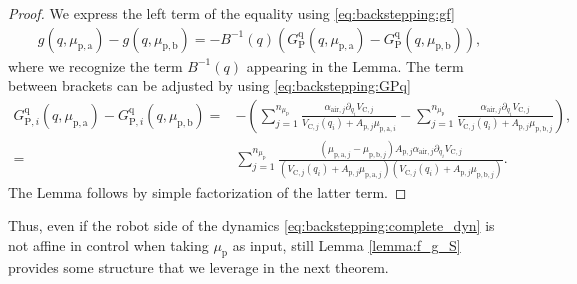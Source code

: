 \begin{proof}
	We express the left term of the equality using \eqref{eq:backstepping:gf}
	\begin{equation*}%
	\begin{split}
	g(q,\mu_{\mathrm{p},\mathrm{a}}) - g(q,\mu_{\mathrm{p},\mathrm{b}}) 
	=-B^{-1}(q) (G_{\mathrm{P}}^{\mathrm{q}}(q,\mu_{\mathrm{p},\mathrm{a}}) - G_{\mathrm{P}}^{\mathrm{q}}(q,\mu_{\mathrm{p},\mathrm{b}})),
	\end{split}
	\end{equation*}
	where we recognize the term $B^{-1}(q)$ appearing in the Lemma. The term between brackets can be adjusted by using \eqref{eq:backstepping:GPq}
	\begin{equation}
	\begin{split}
		G_{\mathrm{P},i}^{\mathrm{q}}(q,\mu_{\mathrm{p},\mathrm{a}}) - G_{\mathrm{P},i}^{\mathrm{q}}(q,\mu_{\mathrm{p},\mathrm{b}}) = &-\left(\sum_{j = 1}^{n_{\mu_\mathrm{p}}}  \frac{\alpha_{\mathrm{air},j} \partial_{q_i}V_{\mathrm{C},j}}{V_{\mathrm{C},j}(q_i) + A_{\mathrm{p},j} \mu_{\mathrm{p},\mathrm{a},i}} \!-\! \sum_{j = 1}^{n_{\mu_\mathrm{p}}}  \frac{\alpha_{\mathrm{air},j} \partial_{q_i}V_{\mathrm{C},j}}{V_{\mathrm{C},j}(q_i) + A_{\mathrm{p},j} \mu_{\mathrm{p},\mathrm{b},j}}\right),  \\
	= &\sum_{j = 1}^{n_{\mu_\mathrm{p}}} \frac{ (\mu_{\mathrm{p},\mathrm{a},j} - \mu_{\mathrm{p},\mathrm{b},j})  A_{\mathrm{p},j} \alpha_{\mathrm{air},j} \partial_{q_i}V_{\mathrm{C},j}}{(V_{\mathrm{C},j}(q_i) + A_{\mathrm{p},j} \mu_{\mathrm{p},\mathrm{a},j})(V_{\mathrm{C},j}(q_i) + A_{\mathrm{p},j} \mu_{\mathrm{p},\mathrm{b},j})}.
	\end{split}
	\end{equation}
	The Lemma follows by simple factorization of the latter term.
\end{proof}

Thus, even if the robot side of the dynamics \eqref{eq:backstepping:complete_dyn} is not affine in control when taking $\mu_\mathrm{p}$ as input, still Lemma \ref{lemma:f_g_S} provides some structure that we leverage in the next theorem.

